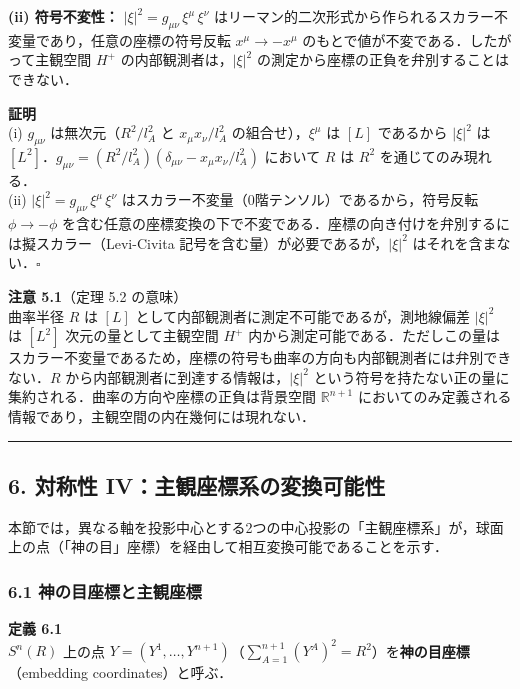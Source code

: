 \documentclass[a4paper,11pt]{ltjsarticle}
\theoremstyle{definition}
\begin{document}
\textbf{(ii) 符号不変性：} \(|\xi|^2 = g_{\mu\nu}\,\xi^\mu\,\xi^\nu\) はリーマン的二次形式から作られるスカラー不変量であり，任意の座標の符号反転 \(x^\mu \to -x^\mu\) のもとで値が不変である．したがって主観空間 \(H^+\) の内部観測者は，\(|\xi|^2\) の測定から座標の正負を弁別することはできない．

\textbf{証明}\\
(i) \(g_{\mu\nu}\) は無次元（\(R^2/l_A^2\) と \(x_\mu x_\nu/l_A^2\) の組合せ），\(\xi^\mu\) は \([L]\) であるから \(|\xi|^2\) は \([L^2]\)．\(g_{\mu\nu} = (R^2/l_A^2)(\delta_{\mu\nu} - x_\mu x_\nu/l_A^2)\) において \(R\) は \(R^2\) を通じてのみ現れる．\\
(ii) \(|\xi|^2 = g_{\mu\nu}\,\xi^\mu\,\xi^\nu\) はスカラー不変量（0階テンソル）であるから，符号反転 \(\phi \to -\phi\) を含む任意の座標変換の下で不変である．座標の向き付けを弁別するには擬スカラー（Levi-Civita 記号を含む量）が必要であるが，\(|\xi|^2\) はそれを含まない．\(\square\)

\textbf{注意 5.1}（定理 5.2 の意味）\\
曲率半径 \(R\) は \([L]\) として内部観測者に測定不可能であるが，測地線偏差 \(|\xi|^2\) は \([L^2]\) 次元の量として主観空間 \(H^+\) 内から測定可能である．ただしこの量はスカラー不変量であるため，座標の符号も曲率の方向も内部観測者には弁別できない．\(R\) から内部観測者に到達する情報は，\(|\xi|^2\) という符号を持たない正の量に集約される．曲率の方向や座標の正負は背景空間 \(\mathbb{R}^{n+1}\) においてのみ定義される情報であり，主観空間の内在幾何には現れない．

\begin{center}\rule{0.5\linewidth}{0.5pt}\end{center}

\subsection{6. 対称性 IV：主観座標系の変換可能性}\label{ux5bfeux79f0ux6027-ivux4e3bux89b3ux5ea7ux6a19ux7cfbux306eux5909ux63dbux53efux80fdux6027}

本節では，異なる軸を投影中心とする2つの中心投影の「主観座標系」が，球面上の点（「神の目」座標）を経由して相互変換可能であることを示す．

\subsubsection{6.1 神の目座標と主観座標}\label{ux795eux306eux76eeux5ea7ux6a19ux3068ux4e3bux89b3ux5ea7ux6a19}

\textbf{定義 6.1}\\
\(S^n(R)\) 上の点 \(Y = (Y^1, \ldots, Y^{n+1})\)（\(\sum_{A=1}^{n+1}(Y^A)^2 = R^2\)）を\textbf{神の目座標}（embedding coordinates）と呼ぶ．
\end{document}
